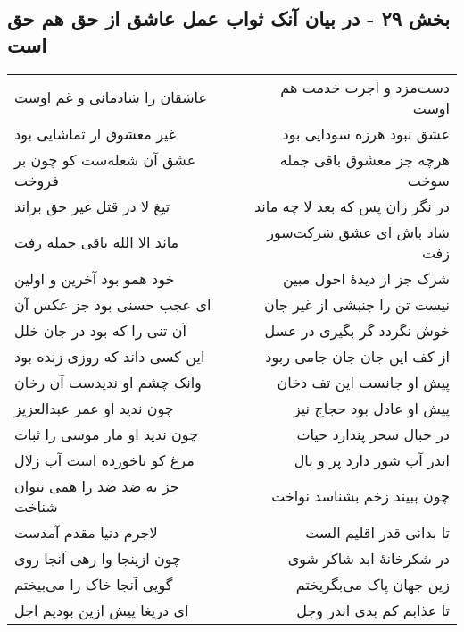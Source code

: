 \begin{center}
\section*{بخش ۲۹ - در بیان آنک ثواب عمل عاشق از حق هم حق است}
\label{sec:sh029}
\begin{longtable}{l p{0.5cm} r}
عاشقان را شادمانی و غم اوست
&&
دست‌مزد و اجرت خدمت هم اوست
\\
غیر معشوق ار تماشایی بود
&&
عشق نبود هرزه سودایی بود
\\
عشق آن شعله‌ست کو چون بر فروخت
&&
هرچه جز معشوق باقی جمله سوخت
\\
تیغ لا در قتل غیر حق براند
&&
در نگر زان پس که بعد لا چه ماند
\\
ماند الا الله باقی جمله رفت
&&
شاد باش ای عشق شرکت‌سوز زفت
\\
خود همو بود آخرین و اولین
&&
شرک جز از دیدهٔ احول مبین
\\
ای عجب حسنی بود جز عکس آن
&&
نیست تن را جنبشی از غیر جان
\\
آن تنی را که بود در جان خلل
&&
خوش نگردد گر بگیری در عسل
\\
این کسی داند که روزی زنده بود
&&
از کف این جان جان جامی ربود
\\
وانک چشم او ندیدست آن رخان
&&
پیش او جانست این تف دخان
\\
چون ندید او عمر عبدالعزیز
&&
پیش او عادل بود حجاج نیز
\\
چون ندید او مار موسی را ثبات
&&
در حبال سحر پندارد حیات
\\
مرغ کو ناخورده است آب زلال
&&
اندر آب شور دارد پر و بال
\\
جز به ضد ضد را همی نتوان شناخت
&&
چون ببیند زخم بشناسد نواخت
\\
لاجرم دنیا مقدم آمدست
&&
تا بدانی قدر اقلیم الست
\\
چون ازینجا وا رهی آنجا روی
&&
در شکرخانهٔ ابد شاکر شوی
\\
گویی آنجا خاک را می‌بیختم
&&
زین جهان پاک می‌بگریختم
\\
ای دریغا پیش ازین بودیم اجل
&&
تا عذابم کم بدی اندر وجل
\\
\end{longtable}
\end{center}
